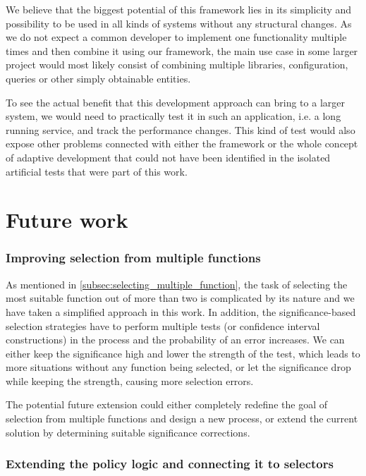 We believe that the biggest potential of this framework lies in its simplicity and possibility to be used in all kinds of systems without any structural changes. As we do not expect a common developer to implement one functionality multiple times and then combine it using our framework, the main use case in some larger project would most likely consist of combining multiple libraries, configuration, queries or other simply obtainable entities.

To see the actual benefit that this development approach can bring to a larger system, we would need to practically test it in such an application, i.e. a long running service, and track the performance changes. This kind of test would also expose other problems connected with either the framework or the whole concept of adaptive development that could not have been identified in the isolated artificial tests that were part of this work.

\section*{Future work}

\subsubsection{Improving selection from multiple functions}
\label{subsec:problem_selecting_multiple}

As mentioned in \ref{subsec:selecting_multiple_function}, the task of selecting the most suitable function out of more than two is complicated by its nature and we have taken a simplified approach in this work. In addition, the significance-based selection strategies have to perform multiple tests (or confidence interval constructions) in the process and the probability of an error increases. We can either keep the significance high and lower the strength of the test, which leads to more situations without any function being selected, or let the significance drop while keeping the strength, causing more selection errors.

The potential future extension could either completely redefine the goal of selection from multiple functions and design a new process, or extend the current solution by determining suitable significance corrections.

\subsubsection{Extending the policy logic and connecting it to selectors}

